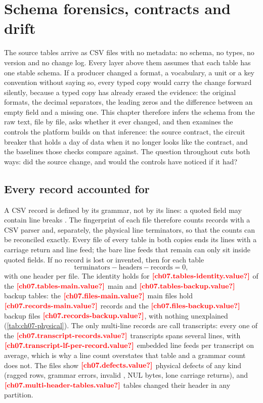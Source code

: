 \chapter{Schema forensics, contracts and drift}\label{ch:schema-forensics}

The source tables arrive as CSV files with no metadata: no schema, no types, no version and no change log. Every
layer above them assumes that each table has one stable schema. If a producer changed a format, a vocabulary, a unit or
a key convention without saying so, every typed copy would carry the change forward silently, because a typed copy has
already erased the evidence: the original formats, the decimal separators, the leading zeros and the difference
between an empty field and a missing one. This chapter therefore infers the schema from the raw text, file by file,
asks whether it ever changed, and then examines the controls the platform builds on that inference: the source
contract, the circuit breaker that holds a day of data when it no longer looks like the contract, and the baselines
those checks compare against. The question throughout cuts both ways: did the source change, and would the controls
have noticed if it had?

\section{Every record accounted for}\label{sec:sf-physical}

A CSV record is defined by its grammar, not by its lines: a quoted field may contain line breaks
\autocite{shafranovich2005}. The fingerprint of each file therefore counts records with a CSV parser and, separately,
the physical line terminators, so that the counts can be reconciled exactly. Every file of every table in both copies
ends its lines with a carriage return and line feed; the bare line feeds that remain can only sit inside quoted
fields. If no record is lost or invented, then for each table
\begin{equation}\label{eq:sf-identity}
  \text{terminators} - \text{headers} - \text{records} = 0 ,
\end{equation}
with one header per file. The identity holds for $\est{ch07.tables-identity}{value}$ of the
$\est{ch07.tables-main}{value}$ main and $\est{ch07.tables-backup}{value}$ backup tables: the
$\est{ch07.files-main}{value}$ main files hold $\est{ch07.records-main}{value}$ records and the
$\est{ch07.files-backup}{value}$ backup files $\est{ch07.records-backup}{value}$, with nothing unexplained
(\cref{tab:ch07-physical}). The only multi-line records are call transcripts: every one of the
$\est{ch07.transcript-records}{value}$ transcripts spans several lines, with $\est{ch07.transcript-lf-per-record}{value}$
embedded line feeds per transcript on average, which is why a line count overstates that table and a grammar count does
not. The files show $\est{ch07.defects}{value}$ physical defects of any kind (ragged rows, grammar errors, invalid
, NUL bytes, lone carriage returns), and $\est{ch07.multi-header-tables}{value}$ tables changed their header in any
partition.

